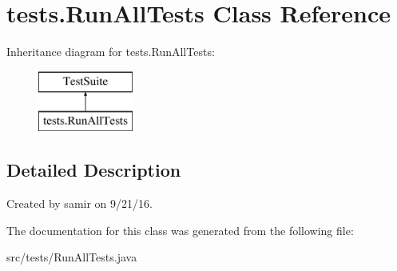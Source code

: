 \hypertarget{classtests_1_1_run_all_tests}{}\section{tests.\+Run\+All\+Tests Class Reference}
\label{classtests_1_1_run_all_tests}
Inheritance diagram for tests.\+Run\+All\+Tests\+:\begin{figure}[H]
\begin{center}
\leavevmode
\includegraphics[height=2.000000cm]{classtests_1_1_run_all_tests}
\end{center}
\end{figure}


\subsection{Detailed Description}
Created by samir on 9/21/16. 

The documentation for this class was generated from the following file\+:\begin{DoxyCompactItemize}
\item 
src/tests/Run\+All\+Tests.\+java\end{DoxyCompactItemize}
